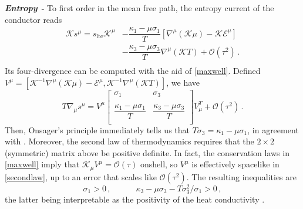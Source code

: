 \documentclass[a4paper, amsfonts, amssymb, amsmath, reprint, showkeys, nofootinbib, twoside,notitlepage]{revtex4-1}
\newcommand{\spc}{\quad \quad \quad}
\newcommand{\K}{{\mathcal{K}}}
\theoremstyle{definition}
\theoremstyle{theorem}
\begin{document}
\newpage
\noindent\textit{\bf Entropy -} To first order in the mean free path, the entropy current of the conductor reads \cite{Israel1981}
\begin{equation}\label{entroycurrent}
\begin{split}
\K s^\mu = s_\text{lte} \K^\mu &{-}\dfrac{\kappa_1{-}\mu\sigma_1}{T} [\nabla^\mu (\K\mu){-}\K\mathcal{E}^\mu] \\ &{-}\dfrac{\kappa_3{-}\mu\sigma_3}{T} \nabla^\mu (\K T)+\mathcal{O}(\tau^2) \, .\\
\end{split}
\end{equation}
Its four-divergence can be computed with the aid of \eqref{maxwell}. Defined
$V^\mu =[\K^{-1}\nabla^\mu(\K \mu){-}\mathcal{E}^\mu, \K^{-1}\nabla^\mu(\K T)]$, we have
\begin{equation}\label{secondlaw}
T\nabla_\mu s^\mu =V^\mu
\begin{bmatrix}
\sigma_1 & \sigma_3 \\
\\
\dfrac{\kappa_1{-}\mu\sigma_1}{T} & \dfrac{\kappa_3{-}\mu\sigma_3}{T} \\
\end{bmatrix}V^T_\mu +\mathcal{O}(\tau^2) \, .
\end{equation}
Then, Onsager's principle \cite[\S 14.5]{Callen_book} immediately tells us that $T\sigma_3=\kappa_1{-}\mu\sigma_1$, in agreement with \cite{Bajec:2025dqm}. Moreover, the second law of thermodynamics requires that the $2{\times}2$ (symmetric) matrix above be positive definite. In fact, the conservation laws in \eqref{maxwell} imply that $\K_\mu V^\mu {=}\mathcal{O}(\tau)$ onshell, so $V^\mu$ is effectively spacelike in \eqref{secondlaw}, up to an error that scales like $\mathcal{O}(\tau^2)$. The resulting inequalities are
\begin{equation}
\sigma_1>0 \, , \spc \kappa_3-\mu\sigma_3-T\sigma_3^2/\sigma_1>0 \, ,
\end{equation}
the latter being interpretable as the positivity of the heat conductivity \cite[\S 26]{landau8}.
\end{document}
